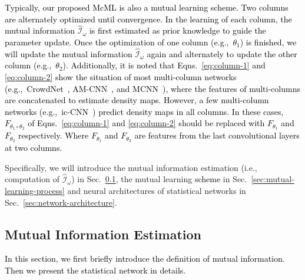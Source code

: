 \documentclass[sigconf]{acmart}
\newcommand{\ljx}[1]{\textcolor{black}{#1}}
\newcommand{\czq}[1]{\textcolor{black}{#1}}
\newcommand{\II}{\mathcal{I}}
\newcommand\Eqs{Eqns.}
\newcommand\Sec{Sec.}
\begin{document}
\czq{Typically, our proposed McML is also a mutual learning \ljx{scheme}.
Two columns are alternately optimized until convergence.
In the learning of each column, the mutual information $\widehat{\II}_{\omega}$ is first estimated as prior knowledge to guide the parameter update.
Once the optimization of one column (e.g.,~$\theta_1$) is finished, we will update the mutual information $\widehat{\II}_{\omega}$ again and alternately to update the other column (e.g.,~$\theta_2$).
Additionally, it is noted that \Eqs~\ref{eq:column-1} and \ref{eq:column-2} show the situation of most multi-column networks (e.g.,~CrowdNet~\cite{deep-shallow-deep-crowdnet-16}, AM-CNN~\cite{deep-geo-Att-head-18}, and MCNN~\cite{MCNN-16}), where the features of multi-columns are concatenated to estimate density maps.
However, a few multi-column networks (e.g.,~ic-CNN~\cite{deep-training-ICCNN-18}) predict density maps in all columns.
In these cases, $F_{\theta_1 \circ \theta_2}$ of \Eqs~\ref{eq:column-1} and \ref{eq:column-2} should be replaced with $F_{\theta_1}$ and $F_{\theta_2}$ respectively.
Where $F_{\theta_1}$ and $F_{\theta_2}$ are features from the last convolutional layers at two columns.}


Specifically, we will introduce the mutual information estimation (i.e., computation of $\widehat{\II}_{\omega}$) in \Sec~\ref{sec:mutual-information-estimation}, the mutual learning \ljx{scheme} in \Sec~\ref{sec:mutual-learning-process} and neural architectures of statistical networks in \Sec~\ref{sec:network-architecture}.

\subsection{Mutual Information Estimation}
\label{sec:mutual-information-estimation}
\czq{In this section, we first briefly introduce the definition of mutual information.
Then we present the statistical network in details.}
\end{document}
